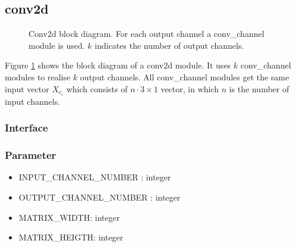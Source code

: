 \subsection{conv2d}

\begin{figure}[h]
	\centering
	
	\caption[Conv2d block diagram.]{Conv2d block diagram. For each output channel a conv\_channel module is used. $k$ indicates the number of output channels.}
	\label{FIG:conv2d}
\end{figure}
Figure \ref{FIG:conv2d} shows the block diagram of a conv2d module. It uses $k$ conv\_channel modules to realise $k$ output channels. 
All conv\_channel modules get the same input vector $X_{c_i}$ which consists of $n \cdot 3 \times 1$ vector, in which $n$ is the number of input channels.  
\subsubsection{Interface}

\subsubsection{Parameter}
\begin{itemize}
 	\item INPUT\_CHANNEL\_NUMBER : integer
 	\item OUTPUT\_CHANNEL\_NUMBER : integer
 	\item MATRIX\_WIDTH: integer
 	\item MATRIX\_HEIGTH: integer
\end{itemize}